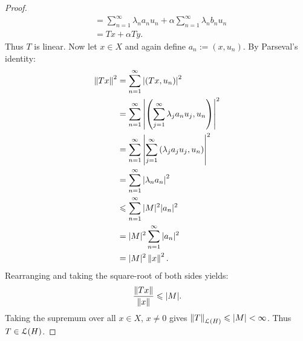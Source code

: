 \begin{proof}
\begin{equation*}
\begin{split}
            & = \sum_{n = 1}^\infty \lambda_n a_n u_n + \alpha \sum_{n = 1}^\infty \lambda_n b_n u _n \\
            & = Tx + \alpha Ty.
        \end{split}
        \end{equation*}
    Thus $T$ is linear. Now let $x \in X$ and again define $a_n := (x,u_n)$. By Parseval's identity:
        \begin{equation*}
        \begin{split}
            \left\lVert Tx \right\rVert^2 
            & = \sum_{n = 1}^\infty \left|  \left( Tx, u_n \right) \right|^2 \\
            & = \sum_{n = 1}^\infty \left|  \left( \sum_{j = 1}^\infty \lambda_j a_n u_j, u_n \right) \right|^2 \\
            & = \sum_{n = 1}^\infty \left| \sum_{j = 1}^\infty \left( \lambda_j a_j u_j , u_n \right) \right|^2 \\
            & = \sum_{n = 1}^\infty \left| \lambda_n a_n \right|^2 \\
            & \leqslant \sum_{n = 1}^\infty |M|^2 |a_n|^2 \\
            & = |M|^2 \sum_{n = 1}^\infty |a_n|^2 \\
            & = |M|^2 \left\lVert x \right\rVert^2.
        \end{split}
        \end{equation*}
    Rearranging and taking the square-root of both sides yields:
        \begin{equation*}
        \begin{split}
            \frac{\left\lVert Tx \right\rVert}{\left\lVert x \right\rVert} \leqslant |M|.
        \end{split}
        \end{equation*}
    Taking the supremum over all $x \in X$, $x \neq 0$ gives $\left\lVert T \right\rVert_{\mathcal{L}(H)} \leqslant |M| < \infty$. Thus $T \in \mathcal{L}(H)$.


\end{proof}
